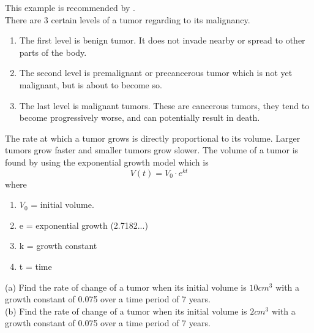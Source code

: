 \begin{flushleft}
This example is recommended by \cite{azalia}.\\
There are 3 certain levels of a tumor regarding to its malignancy.
\begin{enumerate}
    \item The first level is benign tumor. It does not invade nearby or spread to other parts of the body.
    \item The second level is premalignant or precancerous tumor which is not yet malignant, but is about to become so.
    \item The last level is malignant tumors. These are cancerous tumors, they tend to become progressively worse, and can potentially result in death.
\end{enumerate}

The rate at which a tumor grows is directly proportional to its volume. Larger tumors grow faster and smaller tumors grow slower.
The volume of a tumor is found by using the exponential growth model which is
	$$
		V(t) = V_0 \cdot e^{kt}
	$$
	where
	
\begin{enumerate}
    \item $V_0$ = initial volume.
    \item e     = exponential growth (2.7182...)
    \item k     = growth constant
    \item t     = time
\end{enumerate}

(a) Find the rate of change of a tumor when its initial volume is $10cm^3$ with a growth constant of 0.075 over a time period of 7 years.\\
(b) Find the rate of change of a tumor when its initial volume is $2cm^3$ with a growth constant of 0.075 over a time period of 7 years.
\end{flushleft}

